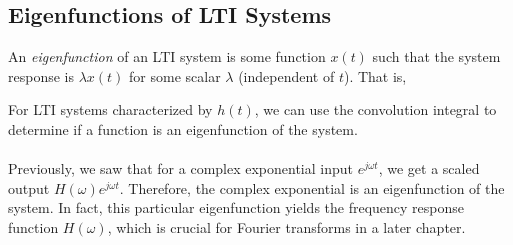 \documentclass{report}
\begin{document}
\subsection{Eigenfunctions of LTI Systems}
An \emph{eigenfunction} of an LTI system is some function $x(t)$ such that the system response is $\lambda x(t)$ for some scalar $\lambda$ (independent of $t$). That is,  
\begin{center}
\end{center}
For LTI systems characterized by $h(t)$, we can use the convolution integral to determine if a function 
is an eigenfunction of the system. 
\\ \\
Previously, we saw that for a complex exponential input $e^{j\omega t}$, 
we get a scaled output $H(\omega)e^{j\omega t}$. Therefore, the complex exponential is an eigenfunction of the system. 
In fact, this particular eigenfunction yields the frequency response function $H(\omega)$, which is crucial for Fourier transforms 
in a later chapter.
\begin{center}
\end{center}
\end{document}
